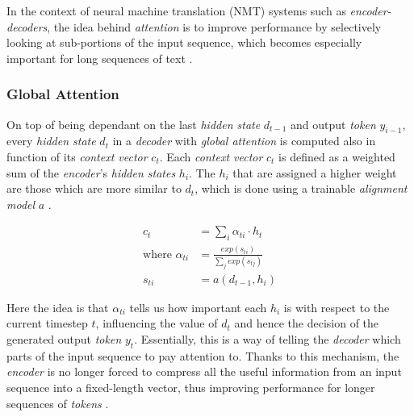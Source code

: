 In the context of neural machine translation (NMT) systems such as \textit{encoder-decoders}, the idea behind \textit{attention} is to improve performance by selectively looking at sub-portions of the input sequence, which becomes especially important for long sequences of text \cite{yao_dual_2018}.

\subsubsection{Global Attention}

On top of being dependant on the last \textit{hidden state} $d_{t-1}$ and output \textit{token} $y_{i-1}$, every \textit{hidden state} $d_t$ in a \textit{decoder} with \textit{global attention} is computed also in function of its \textit{context vector} $c_t$. Each \textit{context vector} $c_t$ is defined as a weighted sum of the \textit{encoder}'s \textit{hidden states} $h_i$. The $h_i$ that are assigned a higher weight are those which are more similar to $d_t$, which is done using a trainable \textit{alignment model} $a$ \cite{bahdanau_neural_2016}.

\begin{equation}
\begin{aligned}
c_t &= \sum_{i} \alpha_{ti} \cdot h_t \\
\mbox{where } \alpha_{ti} &= \frac{exp(s_{ti})}{\sum_{j} exp(s_{tj})} \\
s_{ti} &= a(d_{t-1},h_i)
\end{aligned}
\end{equation}

Here the idea is that $\alpha_{ti}$ tells us how important each $h_i$ is with respect to the current timestep $t$, influencing the value of $d_t$ and hence the decision of the generated output \textit{token} $y_t$. Essentially, this is a way of telling the \textit{decoder} which parts of the input sequence to pay attention to. Thanks to this mechanism, the \textit{encoder} is no longer forced to compress all the useful information from an input sequence into a fixed-length vector, thus improving performance for longer sequences of \textit{tokens} \cite{bahdanau_neural_2016}.